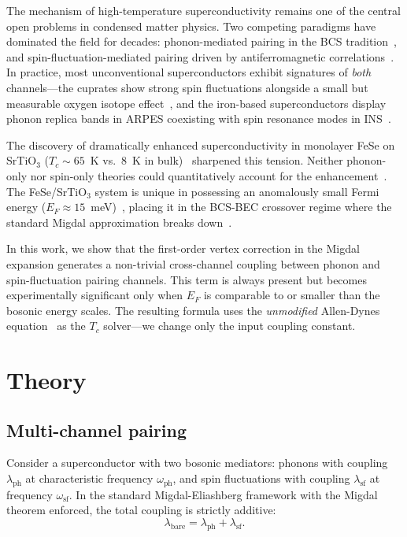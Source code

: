 \documentclass[twocolumn,showpacs,preprintnumbers,amsmath,amssymb,prb]{revtex4-2}
\begin{document}
The mechanism of high-temperature superconductivity remains one of the central open problems in condensed matter physics.
Two competing paradigms have dominated the field for decades: phonon-mediated pairing in the BCS tradition~\cite{BCS1957,Eliashberg1960,AllenDynes1975}, and spin-fluctuation-mediated pairing driven by antiferromagnetic correlations~\cite{Scalapino2012,Monthoux2007}.
In practice, most unconventional superconductors exhibit signatures of \textit{both} channels---the cuprates show strong spin fluctuations alongside a small but measurable oxygen isotope effect~\cite{Franck1994,Zech1994}, and the iron-based superconductors display phonon replica bands in ARPES coexisting with spin resonance modes in INS~\cite{Lee2014,Wang2012}.

The discovery of dramatically enhanced superconductivity in monolayer FeSe on SrTiO$_3$ ($T_c \sim 65$~K vs.\ 8~K in bulk)~\cite{Wang2012FeSe,He2013} sharpened this tension.
Neither phonon-only nor spin-only theories could quantitatively account for the enhancement~\cite{Lee2014,Rademaker2016}.
The FeSe/SrTiO$_3$ system is unique in possessing an anomalously small Fermi energy ($E_F \approx 15$~meV)~\cite{Coldea2018}, placing it in the BCS-BEC crossover regime where the standard Migdal approximation breaks down~\cite{Migdal1958}.

In this work, we show that the first-order vertex correction in the Migdal expansion generates a non-trivial cross-channel coupling between phonon and spin-fluctuation pairing channels.
This term is always present but becomes experimentally significant only when $E_F$ is comparable to or smaller than the bosonic energy scales.
The resulting formula uses the \textit{unmodified} Allen-Dynes equation~\cite{AllenDynes1975} as the $T_c$ solver---we change only the input coupling constant.

\section{Theory}

\subsection{Multi-channel pairing}

Consider a superconductor with two bosonic mediators: phonons with coupling $\lambda_{\mathrm{ph}}$ at characteristic frequency $\omega_{\mathrm{ph}}$, and spin fluctuations with coupling $\lambda_{\mathrm{sf}}$ at frequency $\omega_{\mathrm{sf}}$.
In the standard Migdal-Eliashberg framework with the Migdal theorem enforced, the total coupling is strictly additive:
\begin{equation}
\lambda_{\mathrm{bare}} = \lambda_{\mathrm{ph}} + \lambda_{\mathrm{sf}}.
\end{equation}
\end{document}
